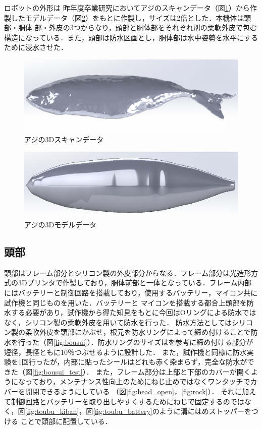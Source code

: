 ロボットの外形は
昨年度卒業研究においてアジのスキャンデータ（図\ref{fig:data_scan}）から作製したモデルデータ（図\ref{fig:data_model}）をもとに作製し，サイズは2倍とした．本機体は頭部・胴体
部・外皮の3つからなり，頭部と胴体部をそれぞれ別の柔軟外皮で包む構造になっている．また，頭部は防水区画とし，胴体部は水中姿勢を水平にするために浸水させた．

\begin{figure}[t]
    \centering
    \includegraphics[width=0.7\linewidth]{chapters/picture/scan.png}
    \caption{アジの3Dスキャンデータ}
    \label{fig:data_scan}
\end{figure}
\begin{figure}[t]
    \centering
    \includegraphics[width=0.7\linewidth]{chapters/picture/fishkinji2.png}
    \caption{アジの3Dモデルデータ}
    \label{fig:data_model}
\end{figure}

\subsection{頭部}
頭部はフレーム部分とシリコン製の外皮部分からなる．フレーム部分は光造形方式の3Dプリンタで作製しており，胴体前部と一体となっている．フレーム内部にはバッテリーと制御回路を搭載しており，使用するバッテリー，マイコン共に試作機と同じものを用いた．バッテリーと
マイコンを搭載する都合上頭部を防水する必要があり，試作機から得た知見をもとに今回はOリングによる防水ではなく，シリコン製の柔軟外皮を用いて防水を行った．
防水方法としてはシリコン製の柔軟外皮を頭部にかぶせ，根元を防水リングによって締め付けることで防水を行った（図\ref{fig:bousui}）．防水リングのサイズは\cite{juuiti}を参考に締め付ける部分が
短径，長径ともに10％つぶせるように設計した．
また，試作機と同様に防水実験を1回行ったが，内部に貼ったシールはどれも赤く染まらず，完全な防水ができた（図\ref{fig:bousui_test}）．
また，フレーム部分は上部と下部のカバーが開くようになっており，メンテナンス性向上のためにねじ止めではなくワンタッチでカバーを開閉できるようにしている
（図\ref{fig:head_open}，\ref{fig:rock}）．
それに加えて制御回路とバッテリーを取り出しやすくするためにねじで固定するのではなく，図\ref{fig:toubu_kiban}，図\ref{fig:toubu_battery}のように溝にはめストッパーをつける
ことで頭部に配置している．

